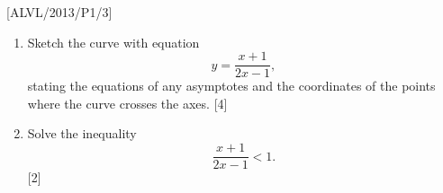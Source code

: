 \item {[}ALVL/2013/P1/3{]}
\begin{enumerate}
\item Sketch the curve with equation 
\[
y=\frac{x+1}{2x-1},
\]
 stating the equations of any asymptotes and the coordinates of the
points where the curve crosses the axes. \hfill{} {[}4{]}
\item Solve the inequality 
\[
\frac{x+1}{2x-1}<1.
\]
{[}2{]}
\end{enumerate}
